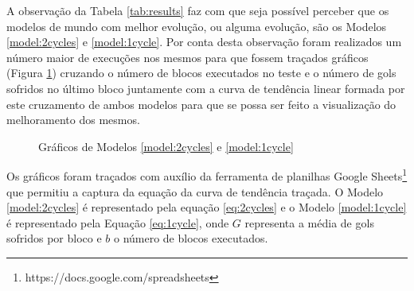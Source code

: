 
A observação da Tabela \ref{tab:results} faz com que seja possível perceber que
os modelos de mundo com melhor evolução, ou alguma evolução, são os Modelos
\ref{model:2cycles} e \ref{model:1cycle}. Por conta desta observação foram
realizados um número maior de execuções nos mesmos para que fossem 
traçados gráficos (Figura \ref{img:graph}) cruzando o número de blocos executados no teste e o número de
gols sofridos no último bloco juntamente com a curva de tendência linear formada
por este cruzamento de ambos modelos para que se possa ser feito a visualização
do melhoramento dos mesmos.

\begin{figure}[!htb]
\centering
    \caption{\label{img:graph} Gráficos de Modelos \ref{model:2cycles} e \ref{model:1cycle}}
    \qquad
    \vspace{1.5em}
\end{figure}

Os gráficos foram traçados com auxílio da ferramenta de planilhas Google Sheets\footnote{https://docs.google.com/spreadsheets} que
permitiu a captura da equação da curva de tendência traçada. O Modelo
\ref{model:2cycles} é representado pela equação \ref{eq:2cycles} e o Modelo
\ref{model:1cycle} é representado pela Equação \ref{eq:1cycle}, onde $G$
representa a média de gols sofridos por bloco e $b$ o número de blocos executados.

